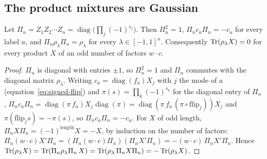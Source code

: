 \subsection{The product mixtures are Gaussian}
\label{sec:mixture-gaussian}

\begin{lemma}[Parity]\label{lem:parity}
Let $\Pi_n=Z_1Z_2\cdots Z_n=\operatorname{diag}\bigl(\prod_j(-1)^{s_j}\bigr)$. Then $\Pi_n^2=1$,
$\Pi_nc_a\Pi_n=-c_a$ for every label $a$, and $\Pi_n\rho_\lambda\Pi_n=\rho_\lambda$ for every
$\lambda\in[-1,1]^n$. Consequently $\operatorname{Tr}(\rho_\lambda X)=0$ for every product $X$ of an odd number
of factors $w\cdot c$.
\end{lemma}
\begin{proof}
$\Pi_n$ is diagonal with entries $\pm1$, so $\Pi_n^2=1$ and $\Pi_n$ commutes with the diagonal
matrix $\rho_\lambda$. Writing $c_a=\operatorname{diag}(f_a)X_j$ with $j$ the mode of $a$
(equation~\eqref{eq:signed-flip}) and $\pi(s)=\prod_k(-1)^{s_k}$ for the diagonal entry of $\Pi_n$,
$\Pi_nc_a\Pi_n=\operatorname{diag}(\pi\,f_a)X_j\operatorname{diag}(\pi)=\operatorname{diag}(\pi\,f_a\,(\pi\circ\mathrm{flip}_j))X_j$
and $\pi(\mathrm{flip}_js)=-\pi(s)$, so $\Pi_nc_a\Pi_n=-c_a$. For $X$ of odd length,
$\Pi_nX\Pi_n=(-1)^{\text{length}}X=-X$, by induction on the number of factors: $\Pi_n(w\cdot c)X'\Pi_n
=(\Pi_n(w\cdot c)\Pi_n)(\Pi_nX'\Pi_n)=-(w\cdot c)\,\Pi_nX'\Pi_n$. Hence
$\operatorname{Tr}(\rho_\lambda X)=\operatorname{Tr}(\Pi_n\rho_\lambda\Pi_n\,X)=\operatorname{Tr}(\rho_\lambda\,\Pi_nX\Pi_n)=-\operatorname{Tr}(\rho_\lambda X)$.
\end{proof}

